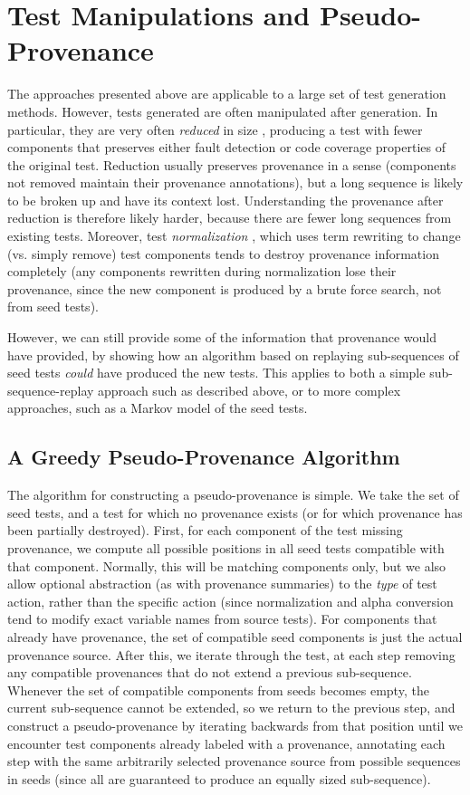 \documentclass[final]{article}
\begin{document}
\section{Test Manipulations and Pseudo-Provenance}

The approaches presented above are applicable to a large set of test
generation methods.  However, tests generated are often manipulated
after generation.  In particular, they are very often \emph{reduced}
in size \cite{DD}, producing a test with fewer components that
preserves either fault detection or code coverage \cite{icst2014}
properties of the original test.  Reduction usually preserves
provenance in a sense (components not removed maintain their
provenance annotations), but a long sequence is likely to be broken up
and have its context lost.  Understanding the provenance after
reduction is therefore likely harder, because there are fewer long sequences
from existing tests.  Moreover, test \emph{normalization} \cite{Groce:2017:OTR:3092703.3092704}, which uses
term rewriting to change (vs. simply remove) test components tends to
destroy provenance information completely (any components rewritten
during normalization
lose their provenance, since the new component is produced by a brute
force search, not from seed tests).

However, we can still provide some of the information that provenance
would have provided, by showing how an algorithm based on replaying
sub-sequences of seed tests \emph{could} have produced the new tests.
This applies to both a simple sub-sequence-replay approach such as
described above, or to more complex approaches, such as a Markov model
of the seed tests.

\subsection{A Greedy Pseudo-Provenance Algorithm}

The algorithm for constructing a pseudo-provenance is simple.  We take
the set of seed tests, and a test for which no provenance exists (or
for which provenance has been partially destroyed).  First, for each
component of the test missing provenance, we compute all possible
positions in all seed tests compatible with that component.  Normally,
this will be matching components only, but we also allow optional abstraction
(as with provenance summaries) to the \emph{type} of test action,
rather than the specific action (since normalization and alpha
conversion tend to modify exact variable names from source tests).
For components that already have provenance, the set of compatible
seed components is just the actual provenance source.   After this, we
iterate through the test, at each step removing any compatible
provenances that do not extend a previous sub-sequence.  Whenever the
set of compatible components from seeds becomes empty, the current
sub-sequence cannot be extended, so we return to the previous step,
and construct a pseudo-provenance by iterating backwards from that
position until we encounter test components already labeled with a
provenance, annotating each step with the same arbitrarily selected
provenance source from possible sequences in seeds (since all are guaranteed to produce an equally sized
sub-sequence).
\end{document}

